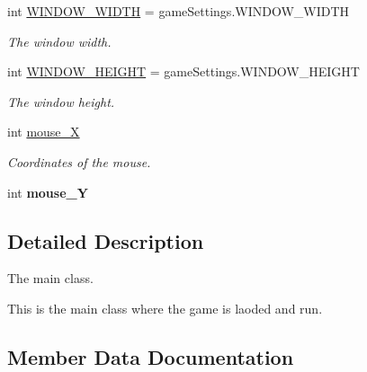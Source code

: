 \begin{DoxyCompactItemize}
\mbox{\label{class_space_game_ac1ec1fbe39ce5b122675a7fd668c8ea3}} 
int \hyperlink{class_space_game_ac1ec1fbe39ce5b122675a7fd668c8ea3}{W\+I\+N\+D\+O\+W\+\_\+\+W\+I\+D\+TH} = game\+Settings.\+W\+I\+N\+D\+O\+W\+\_\+\+W\+I\+D\+TH
\begin{DoxyCompactList}\small\item\em The window width. \end{DoxyCompactList}\item 
\mbox{\label{class_space_game_aa557f0135ff2281fbfe7eaa69723b6c5}} 
int \hyperlink{class_space_game_aa557f0135ff2281fbfe7eaa69723b6c5}{W\+I\+N\+D\+O\+W\+\_\+\+H\+E\+I\+G\+HT} = game\+Settings.\+W\+I\+N\+D\+O\+W\+\_\+\+H\+E\+I\+G\+HT
\begin{DoxyCompactList}\small\item\em The window height. \end{DoxyCompactList}\item 
\mbox{\label{class_space_game_a23e048b8ccf23343a4f9a9f67d1df3ba}} 
int \hyperlink{class_space_game_a23e048b8ccf23343a4f9a9f67d1df3ba}{mouse\+\_\+X}
\begin{DoxyCompactList}\small\item\em Coordinates of the mouse. \end{DoxyCompactList}\item 
\mbox{\label{class_space_game_a503f8ad7c3466ce91ab40f74b29b0097}} 
int {\bfseries mouse\+\_\+Y}
\end{DoxyCompactItemize}


\subsection{Detailed Description}
The main class. 

This is the main class where the game is laoded and run. 

\subsection{Member Data Documentation}
\mbox{\label{class_space_game_a59e762b653e6952d65f8dd51b055bc2f}} 
